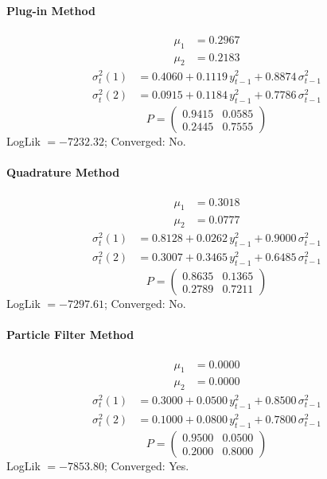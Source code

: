 \documentclass[11pt, a4paper]{article}
\begin{document}
\paragraph{Plug-in Method}
\begin{align}
\mu_{1} &= 0.2967 \\
\mu_{2} &= 0.2183
\end{align}
\begin{align}
\sigma^2_{t}(1) &= 0.4060 + 0.1119\, y_{t-1}^2 + 0.8874\, \sigma^2_{t-1} \\
\sigma^2_{t}(2) &= 0.0915 + 0.1184\, y_{t-1}^2 + 0.7786\, \sigma^2_{t-1}
\end{align}
\begin{equation}
P = \begin{pmatrix} 0.9415 & 0.0585 \\ 0.2445 & 0.7555 \end{pmatrix}
\end{equation}
LogLik $= -7232.32$; Converged: No.

\paragraph{Quadrature Method}
\begin{align}
\mu_{1} &= 0.3018 \\
\mu_{2} &= 0.0777
\end{align}
\begin{align}
\sigma^2_{t}(1) &= 0.8128 + 0.0262\, y_{t-1}^2 + 0.9000\, \sigma^2_{t-1} \\
\sigma^2_{t}(2) &= 0.3007 + 0.3465\, y_{t-1}^2 + 0.6485\, \sigma^2_{t-1}
\end{align}
\begin{equation}
P = \begin{pmatrix} 0.8635 & 0.1365 \\ 0.2789 & 0.7211 \end{pmatrix}
\end{equation}
LogLik $= -7297.61$; Converged: No.

\paragraph{Particle Filter Method}
\begin{align}
\mu_{1} &= 0.0000 \\
\mu_{2} &= 0.0000
\end{align}
\begin{align}
\sigma^2_{t}(1) &= 0.3000 + 0.0500\, y_{t-1}^2 + 0.8500\, \sigma^2_{t-1} \\
\sigma^2_{t}(2) &= 0.1000 + 0.0800\, y_{t-1}^2 + 0.7800\, \sigma^2_{t-1}
\end{align}
\begin{equation}
P = \begin{pmatrix} 0.9500 & 0.0500 \\ 0.2000 & 0.8000 \end{pmatrix}
\end{equation}
LogLik $= -7853.80$; Converged: Yes.
\end{document}
